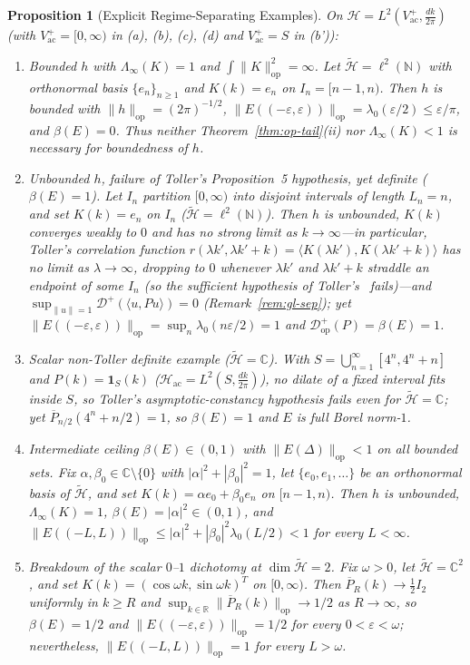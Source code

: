 \documentclass[11pt,a4paper]{article}
\newtheorem{proposition}[theorem]{Proposition}
\theoremstyle{definition}
\theoremstyle{remark}
\newcommand{\HH}{\mathcal{H}}
\newcommand{\tH}{\widetilde{\mathcal{H}}}
\newcommand{\RR}{\mathbb{R}}
\newcommand{\CC}{\mathbb{C}}
\newcommand{\NN}{\mathbb{N}}
\newcommand{\op}{\mathrm{op}}
\newcommand{\ac}{\mathrm{ac}}
\newcommand{\one}{\mathbf{1}}
\newcommand{\ip}[2]{\langle #1, #2 \rangle}
\newcommand{\norm}[1]{\|#1\|}
\begin{document}
\begin{proposition}[Explicit Regime-Separating Examples]\label{prop:examples}
On $\HH=L^2(V_\ac^+,\frac{dk}{2\pi})$ (with $V_\ac^+=[0,\infty)$ in \textup{(a)}, \textup{(b)}, \textup{(c)}, \textup{(d)} and $V_\ac^+=S$ in \textup{(b')}):
\begin{enumerate}[label=\textup{(\alph*)},leftmargin=*]
\item \emph{Bounded $h$ with $\Lambda_\infty(K)=1$ and $\int\norm{K}_{\op}^2=\infty$.} Let $\tH=\ell^2(\NN)$ with orthonormal basis $\{e_n\}_{n\ge 1}$ and $K(k)=e_n$ on $I_n=[n-1,n)$. Then $h$ is bounded with $\norm{h}_{\op}=(2\pi)^{-1/2}$, $\norm{E((-\varepsilon,\varepsilon))}_{\op}=\lambda_0(\varepsilon/2)\le \varepsilon/\pi$, and $\beta(E)=0$. Thus neither Theorem~\ref{thm:op-tail}(ii) nor $\Lambda_\infty(K)<1$ is necessary for boundedness of $h$.
\item \emph{Unbounded $h$, failure of Toller's Proposition~5 hypothesis, yet definite ($\beta(E)=1$).} Let $I_n$ partition $[0,\infty)$ into disjoint intervals of length $L_n=n$, and set $K(k)=e_n$ on $I_n$ ($\tH=\ell^2(\NN)$). Then $h$ is unbounded, $K(k)$ converges weakly to $0$ and has no strong limit as $k\to\infty$---in particular, Toller's correlation function $r(\lambda k',\lambda k'+k)=\ip{K(\lambda k')}{K(\lambda k'+k)}$ has no limit as $\lambda\to\infty$, dropping to $0$ whenever $\lambda k'$ and $\lambda k'+k$ straddle an endpoint of some $I_n$ (so the sufficient hypothesis of Toller's~\cite[Prop.~5]{Toller1999} fails)---and $\sup_{\norm{u}=1}\mathcal{D}^+(\ip{u}{Pu})=0$ (Remark~\ref{rem:gl-sep}); yet $\norm{E((-\varepsilon,\varepsilon))}_{\op}=\sup_n\lambda_0(n\varepsilon/2)=1$ and $\mathcal{D}_{\op}^+(P)=\beta(E)=1$.
\item[\textup{(b')}] \emph{Scalar non-Toller definite example ($\tH=\CC$).} With $S=\bigcup_{n=1}^\infty [4^n, 4^n+n]$ and $P(k)=\one_S(k)$ ($\HH_\ac=L^2(S,\frac{dk}{2\pi})$), no dilate of a fixed interval fits inside $S$, so Toller's asymptotic-constancy hypothesis fails even for $\tH=\CC$; yet $\overline{P}_{n/2}(4^n+n/2)=1$, so $\beta(E)=1$ and $E$ is full Borel norm-$1$.
\item \emph{Intermediate ceiling $\beta(E)\in(0,1)$ with $\norm{E(\Delta)}_{\op}<1$ on all bounded sets.} Fix $\alpha,\beta_0\in\CC\setminus\{0\}$ with $|\alpha|^2+|\beta_0|^2=1$, let $\{e_0,e_1,\dots\}$ be an orthonormal basis of $\tH$, and set $K(k)=\alpha e_0 + \beta_0 e_n$ on $[n-1,n)$. Then $h$ is unbounded, $\Lambda_\infty(K)=1$, $\beta(E)=|\alpha|^2\in(0,1)$, and $\norm{E((-L,L))}_{\op}\le |\alpha|^2+|\beta_0|^2\lambda_0(L/2)<1$ for every $L<\infty$.
\item \emph{Breakdown of the scalar $0$--$1$ dichotomy at $\dim\tH=2$.} Fix $\omega>0$, let $\tH=\CC^2$, and set $K(k)=(\cos\omega k,\sin\omega k)^T$ on $[0,\infty)$. Then $\overline{P}_R(k)\to\frac{1}{2}I_2$ uniformly in $k\ge R$ and $\sup_{k\in\RR}\norm{\overline{P}_R(k)}_{\op}\to 1/2$ as $R\to\infty$, so $\beta(E)=1/2$ and $\norm{E((-\varepsilon,\varepsilon))}_{\op}=1/2$ for every $0<\varepsilon<\omega$; nevertheless, $\norm{E((-L,L))}_{\op}=1$ for every $L>\omega$.
\end{enumerate}
\end{proposition}
\end{document}
